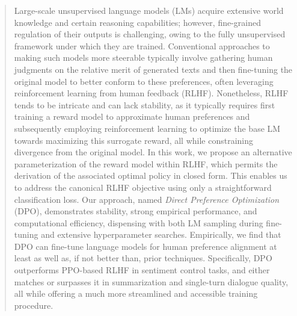 \begin{abstract}
Large-scale unsupervised language models (LMs) acquire extensive world knowledge and certain reasoning capabilities; however, fine-grained regulation of their outputs is challenging, owing to the fully unsupervised framework under which they are trained. Conventional approaches to making such models more steerable typically involve gathering human judgments on the relative merit of generated texts and then fine-tuning the original model to better conform to these preferences, often leveraging reinforcement learning from human feedback (RLHF). Nonetheless, RLHF tends to be intricate and can lack stability, as it typically requires first training a reward model to approximate human preferences and subsequently employing reinforcement learning to optimize the base LM towards maximizing this surrogate reward, all while constraining divergence from the original model. In this work, we propose an alternative parameterization of the reward model within RLHF, which permits the derivation of the associated optimal policy in closed form. This enables us to address the canonical RLHF objective using only a straightforward classification loss. Our approach, named \textit{Direct Preference Optimization} (DPO), demonstrates stability, strong empirical performance, and computational efficiency, dispensing with both LM sampling during fine-tuning and extensive hyperparameter searches. Empirically, we find that DPO can fine-tune language models for human preference alignment at least as well as, if not better than, prior techniques. Specifically, DPO outperforms PPO-based RLHF in sentiment control tasks, and either matches or surpasses it in summarization and single-turn dialogue quality, all while offering a much more streamlined and accessible training procedure.
\end{abstract}

